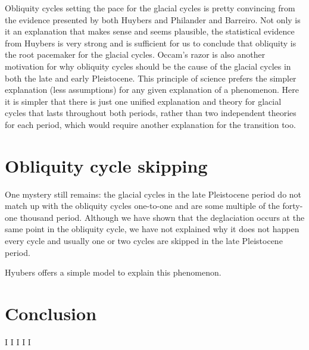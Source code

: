 \documentclass[11pt]{article}
\begin{document}
Obliquity cycles setting the pace for the glacial cycles is pretty convincing from the evidence presented by both Huybers and Philander and Barreiro.
Not only is it an explanation that makes sense and seems plausible, the statistical evidence from Huybers is very strong and is sufficient for us to conclude that obliquity is the root pacemaker for the glacial cycles.
Occam's razor is also another motivation for why obliquity cycles should be the cause of the glacial cycles in both the late and early Pleistocene.
This principle of science prefers the simpler explanation (less assumptions) for any given explanation of a phenomenon.
Here it is simpler that there is just one unified explanation and theory for glacial cycles that lasts throughout both periods, rather than two independent theories for each period, which would require another explanation for the transition too.

\section{Obliquity cycle skipping}
One mystery still remains: the glacial cycles in the late Pleistocene period do not match up with the obliquity cycles one-to-one and are some multiple of the forty-one thousand period.
Although we have shown that the deglaciation occurs at the same point in the obliquity cycle, we have not explained why it does not happen every cycle and usually one or two cycles are skipped in the late Pleistocene period.

Hyubers offers a simple model to explain this phenomenon.   




\section{Conclusion} 



\begin{thebibliography}{9}
		I
		I
        I
		I%
        I%
\end{thebibliography}
\end{document}
